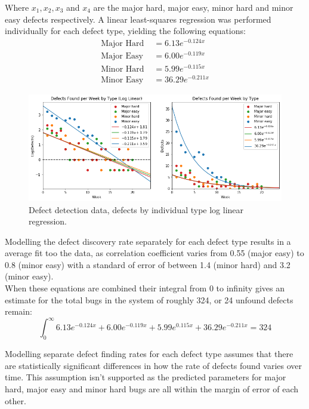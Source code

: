 \documentclass[12pt,a4paper]{article}
\begin{document}
		Where $x_1, x_2, x_3$ and $x_4$ are the major hard, major easy, minor hard and minor easy defects respectively. A linear least-squares regression was performed individually for each defect type, yielding the following equations:
		\begin{align*}
			\text{Major Hard } &= 6.13 e ^ {-0.124 x}\\
			\text{Major Easy } &= 6.00 e ^ {-0.119 x}\\
			\text{Minor Hard } &= 5.99 e ^ {-0.115 x}\\
			\text{Minor Easy } &= 36.29 e ^ {-0.211 x}
		\end{align*}
		
		\begin{figure}[hh]
			\centering
			\includegraphics[scale=0.6]{type_log_lin}
			\caption{Defect detection data, defects by individual type log linear regression.}
		\end{figure}
		
		Modelling the defect discovery rate separately for each defect type results in a average fit too the data, as correlation coefficient varies from 0.55 (major easy) to 0.8 (minor easy) with a standard of error of between 1.4 (minor hard) and 3.2 (minor easy).\\
		
		When these equations are combined their integral from 0 to infinity gives an estimate for the total bugs in the system of roughly 324, or 24 unfound defects remain:\\
		
		\[
		\int_0^\infty 6.13e^{-0.124x} + 6.00e^{-0.119x} + 5.99e^{0.115x} + 36.29e^{-0.211x} = 324
		\]
		
		Modelling separate defect finding rates for each defect type assumes that there are statistically significant differences in how the rate of defects found varies over time. This assumption isn't supported as the predicted parameters for major hard, major easy and minor hard bugs are all within the margin of error of each other.
		
\end{document}
